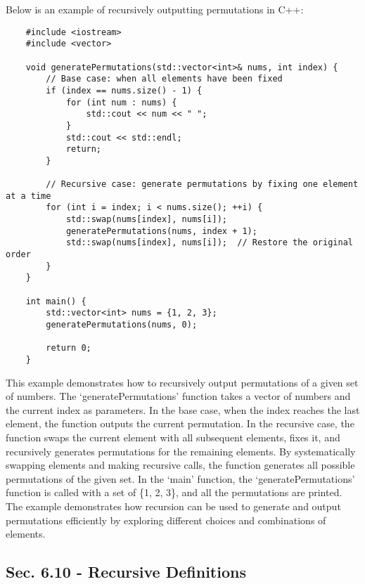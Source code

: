 \begin{solution}
    Below is an example of recursively outputting permutations in C++:

    \horizontalline

    \begin{verbatim}
    #include <iostream>
    #include <vector>
    
    void generatePermutations(std::vector<int>& nums, int index) {
        // Base case: when all elements have been fixed
        if (index == nums.size() - 1) {
            for (int num : nums) {
                std::cout << num << " ";
            }
            std::cout << std::endl;
            return;
        }
    
        // Recursive case: generate permutations by fixing one element at a time
        for (int i = index; i < nums.size(); ++i) {
            std::swap(nums[index], nums[i]);
            generatePermutations(nums, index + 1);
            std::swap(nums[index], nums[i]);  // Restore the original order
        }
    }
    
    int main() {
        std::vector<int> nums = {1, 2, 3};
        generatePermutations(nums, 0);
    
        return 0;
    }
    \end{verbatim}

    \horizontalline

    This example demonstrates how to recursively output permutations of a given set of numbers. The `generatePermutations' function takes a vector of numbers and the current index as parameters. In the base case, when the index reaches the last element, the function outputs the current permutation. In the recursive case, the function swaps the current 
    element with all subsequent elements, fixes it, and recursively generates permutations for the remaining elements. By systematically swapping elements and making recursive calls, the function generates all possible permutations of the given set. In the `main' function, the `generatePermutations' function is called with a set of \{1, 2, 3\}, and all 
    the permutations are printed. The example demonstrates how recursion can be used to generate and output permutations efficiently by exploring different choices and combinations of elements.
\end{solution}

\subsection*{Sec. 6.10 - Recursive Definitions}

